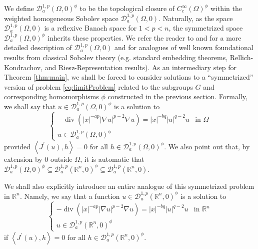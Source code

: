 \documentclass[10pt, reqno]{amsart}
\newcommand{\RR}{\mathbb{R}}
\newcommand{\Om}{\Omega}
\newcommand{\abs}[1]{\left\vert #1 \right\vert}
\newcommand{\inner}[1]{\left\langle#1\right\rangle}
\newcommand{\D}{\mathcal{D}}
\numberwithin{equation}{section}
\theoremstyle{definition}
\theoremstyle{remark}
\theoremstyle{plain}
\begin{document}
	
	We define $\D_a^{1,p}(\Om,0)^\phi$ to be the topological closure of $C_c^\infty(\Om)^\phi$ within the weighted homogeneous Sobolev space $\D_a^{1,p}(\Om,0)$. 	Naturally, as the space $\D_a^{1,p}(\Om,0)$ is a reflexive Banach space for $1 < p < n$, the symmetrized space $\D_a^{1,p}(\Om,0)^\phi$ inherits these properties. We refer the reader to  \cite[Chapter 2]{mscChernysh} and \cite{Chernysh} for a more detailed description of $\D_a^{1,p}(\Om,0)$ and for analogues of well known foundational results from classical Sobolev theory (e.g. standard embedding theorems, Rellich-Kondrachov, and Riesz-Representation results).
	As an intermediary step for Theorem \ref{thm:main}, we shall be forced to consider solutions to a ``symmetrized'' version of problem \eqref{eq:limitProblem} related to the subgroups $G$ and corresponding homomorphisms $\phi$ constructed in the previous section.
	Formally, we shall say that $u \in \D_a^{1,p}(\Om, 0)^\phi$ is a solution to 
	\begin{equation}\label{eq:probOmSym}
		\begin{cases}
			-\operatorname{div}\left(\abs{x}^{-ap}\abs{\nabla u}^{p-2}\nabla u\right) = \abs{x}^{-bq}\abs{u}^{q-2}u &\text{in }\Omega\\
			u\in \D_a^{1,p}(\Om, 0)^\phi
		\end{cases}
	\end{equation}
	provided $\inner{J^\prime(u), h} = 0$ for all $h \in \D_a^{1,p}(\Om, 0)^\phi$. We also point out that, by extension by $0$ outside $\Om$, it is automatic that $\D_a^{1,p}(\Om, 0)^\phi \subseteq \D_a^{1,p}(\RR^n, 0)^\phi \subseteq \D_a^{1,p}(\RR^n,0)$. 
	
	
	We shall also explicitly introduce an entire analogue of this symmetrized problem in $\RR^n$. Namely, we say that a function $u \in \D_a^{1,p}(\RR^n,0)^\phi$ is a solution to
	\begin{equation}\label{eq:limitProblemSym}
		\begin{cases}
			-\operatorname{div}\left(\abs{x}^{-ap}\abs{\nabla u}^{p-2}\nabla u\right) = \abs{x}^{-bq}\abs{u}^{q-2}u &\text{in }\RR^n\\
			u\in \D_a^{1,p}(\RR^n, 0)^\phi
		\end{cases}
	\end{equation}
	if $\inner{J^\prime(u),h} = 0$ for all $h \in \D_a^{1,p}(\RR^n,0)^\phi$.
	
\end{document}
